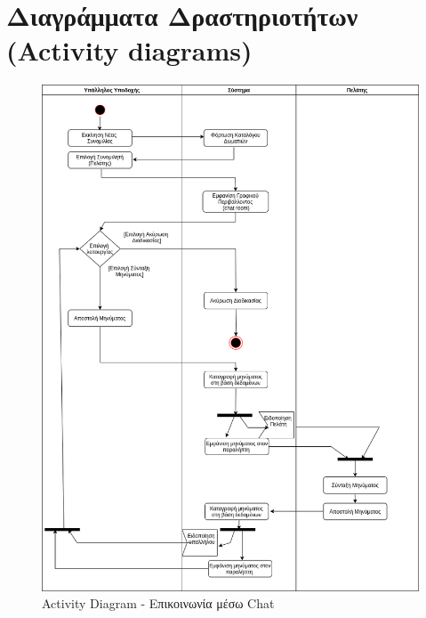 \section{Διαγράμματα Δραστηριοτήτων (Activity diagrams)}
\begin{figure}[H]
	\centering
	\includegraphics[width=1\textwidth]{Images/Activity-Chat}
	\caption{Activity Diagram - Επικοινωνία μέσω Chat}
	\label{Activity - Chat }
\end{figure}

